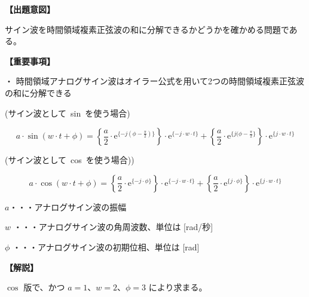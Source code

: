\noindent \textbf{【出題意図】}

\bigskip
\noindent サイン波を時間領域複素正弦波の和に分解できるかどうかを確かめる問題である。

\vspace{1em}
\noindent \textbf{【重要事項】}

\medskip
\noindent ・ 時間領域アナログサイン波はオイラー公式を用いて2つの時間領域複素正弦波の和に分解できる

\medskip
\noindent \mbox{(サイン波として sin を使う場合)}

\[
a \cdot \sin ( w \cdot t + \phi )
=  \left \{ \frac{a}{2} \cdot \textrm{e}^{\{-j (\phi-\frac{\pi}{2}) \}} \right \} \cdot \textrm{e}^{\{-j \cdot w \cdot t \}}
+  \left \{ \frac{a}{2} \cdot \textrm{e}^{\{j (\phi-\frac{\pi}{2} \}} \right \} \cdot \textrm{e}^{\{j \cdot w \cdot t \}}
\]

\medskip
\noindent \mbox{(サイン波として cos を使う場合))}

\[
a \cdot \cos ( w \cdot t + \phi )
=  \left \{ \frac{a}{2} \cdot \textrm{e}^{\{-j \cdot \phi \}} \right \} \cdot \textrm{e}^{\{-j \cdot w \cdot t \}}
+  \left \{ \frac{a}{2} \cdot \textrm{e}^{\{ j \cdot \phi \}} \right \} \cdot \textrm{e}^{\{ j \cdot w \cdot t \}}
\]

\bigskip
\noindent  $a$・・・アナログサイン波の振幅

\bigskip
\noindent $w$ ・・・アナログサイン波の角周波数、単位は [rad/秒]

\bigskip
\noindent $\phi$ ・・・アナログサイン波の初期位相、単位は [rad]

\bigskip

\vspace{1em}
\noindent \textbf{【解説】}

\bigskip

\bigskip
\noindent $\cos$ 版で、かつ $a = 1$、$w = 2$、$\phi = 3$ により求まる。
